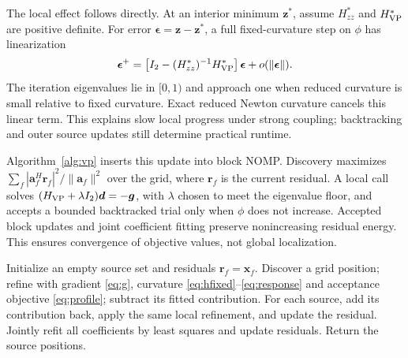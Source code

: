 \documentclass[a4paper,12pt,review]{cas-sc}
\begin{document}
The local effect follows directly. At an interior minimum $\bm z^*$, assume $H_{zz}^*$ and $H_{\rm VP}^*$ are positive definite. For error $\bm\epsilon=\bm z-\bm z^*$, a full fixed-curvature step on $\phi$ has linearization
\begin{equation}
 \bm\epsilon^+=\left[I_2-(H_{zz}^*)^{-1}H_{\rm VP}^*\right]\bm\epsilon
 +o(\|\bm\epsilon\|).
 \label{eq:rate}
\end{equation}
The iteration eigenvalues lie in $[0,1)$ and approach one when reduced curvature is small relative to fixed curvature. Exact reduced Newton curvature cancels this linear term. This explains slow local progress under strong coupling; backtracking and outer source updates still determine practical runtime.

Algorithm~\ref{alg:vp} inserts this update into block NOMP. Discovery maximizes $\sum_f|\bm a_f^H\bm r_f|^2/\|\bm a_f\|^2$ over the grid, where $\bm r_f$ is the current residual. A local call solves $(H_{\rm VP}+\lambda I_2)\bm d=-\bm g$, with $\lambda$ chosen to meet the eigenvalue floor, and accepts a bounded backtracked trial only when $\phi$ does not increase. Accepted block updates and joint coefficient fitting preserve nonincreasing residual energy. This ensures convergence of objective values, not global localization.
\begin{algorithm}[htbp]
\caption{VP-BNOMP with known $K$}\label{alg:vp}
\begin{algorithmic}[1]
\State Initialize an empty source set and residuals $\bm r_f=\bm x_f$.
\State Discover a grid position; refine with gradient \eqref{eq:g}, curvature \eqref{eq:hfixed}--\eqref{eq:response} and acceptance objective \eqref{eq:profile}; subtract its fitted contribution.
\Repeat
\State For each source, add its contribution back, apply the same local refinement, and update the residual.
\State Jointly refit all coefficients by least squares and update residuals.
\EndFor
\State Return the source positions.
\end{algorithmic}
\end{algorithm}

\FloatBarrier
\end{document}
